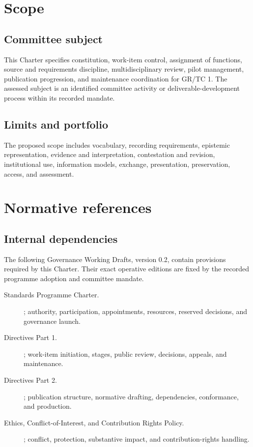 \documentclass[11pt,a4paper]{article}
\begin{document}
\GSPmainmatter
\section{Scope}
\subsection{Committee subject}
This Charter specifies constitution, work-item control, assignment of functions, source and requirements discipline, multidisciplinary review, pilot management, publication progression, and maintenance coordination for GR/TC 1. The assessed subject is an identified committee activity or deliverable-development process within its recorded mandate.


\subsection{Limits and portfolio}
The proposed scope includes vocabulary, recording requirements, epistemic representation, evidence and interpretation, contestation and revision, institutional use, information models, exchange, presentation, preservation, access, and assessment.


\section{Normative references}
\subsection{Internal dependencies}
The following Governance Working Drafts, version 0.2, contain provisions required by this Charter. Their exact operative editions are fixed by the recorded programme adoption and committee mandate.

\begin{description}
\item[Standards Programme Charter.] ; authority, participation, appointments, resources, reserved decisions, and governance launch.
\item[Directives Part 1.] ; work-item initiation, stages, public review, decisions, appeals, and maintenance.
\item[Directives Part 2.] ; publication structure, normative drafting, dependencies, conformance, and production.
\item[Ethics, Conflict-of-Interest, and Contribution Rights Policy.] ; conflict, protection, substantive impact, and contribution-rights handling.
\end{description}
\end{document}
